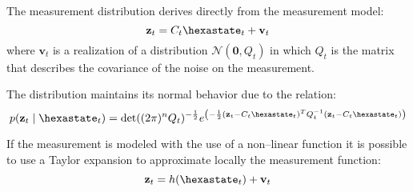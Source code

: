 The measurement distribution derives directly from the measurement model:
\begin{equation}
\mathbf{z}_t = C_t \hexastate_t + \mathbf{v}_t
\end{equation}
where ${\mathbf{v}_t}$ is a realization of a distribution ${\mathcal{N}(\mathbf{0},Q_t)}$ in which $Q_t$ is the matrix that describes the covariance of the noise on the measurement.

The distribution maintains its normal behavior due to the relation:
\[p(\mathbf{z}_t\mid\hexastate_t) = \det((2\pi)^n Q_t)^{-\frac{1}{2}} e^{\left( -\frac{1}{2} (\mathbf{z}_t - C_t \hexastate_t)^T Q_t^{-1} (\mathbf{z}_t - C_t \hexastate_t) \right)}\]

If the measurement is modeled with the use of a non--linear function it is possible to use a Taylor expansion to approximate locally the measurement function:
\begin{equation}
\mathbf{z}_t = h(\hexastate_t) + \mathbf{v}_t
\end{equation}
